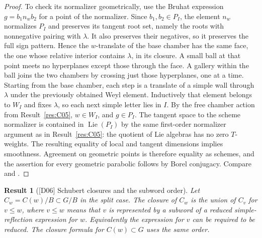 \documentclass[11pt,a4paper,openany,oneside]{book}
\theoremstyle{resultstyle}
\newtheorem{statement}{Result}[chapter]
\newenvironment{result}[2]{\clubpenalty=10000\begin{statement}[\textnormal{[#1]} #2]\leavevmode\label{res:#1}\ignorespaces}{\end{statement}}
\theoremstyle{definition}
\numberwithin{equation}{chapter}
\DeclareMathOperator{\Lie}{Lie}
\begin{document}
\begin{proof}
To check its normalizer geometrically, use the Bruhat expression
\(g=b_1n_wb_2\) for a point of the normalizer.
Since \(b_1,b_2\in P_I\), the element \(n_w\) normalizes
\(P_I\) and preserves its tangent root set, namely the
roots with nonnegative pairing with \(\lambda\).
It also preserves their negatives, so it preserves the
full sign pattern. Hence the \(w\)-translate of the base
chamber has the same face, the one whose relative interior
contains \(\lambda\), in its closure. A small ball at that
point meets no hyperplanes except those through the face.
A gallery within the ball joins the two chambers by
crossing just those hyperplanes, one at a time.
Starting from the base chamber, each step is a translate
of a simple wall through \(\lambda\) under the previously
obtained Weyl element. Inductively that element belongs to
\(W_I\) and fixes \(\lambda\), so each next simple letter
lies in \(I\). By the free chamber action from
Result~\ref{res:C05}, \(w\in W_I\), and \(g\in P_I\).
The tangent space to the scheme normalizer is contained
in \(\Lie(P_I)\) by the same first-order normalizer argument
as in Result~\ref{res:C05}: the quotient of Lie algebras has
no zero \(T\)-weights. The resulting equality of local
and tangent dimensions implies smoothness. Agreement on
geometric points is therefore equality as schemes, and
the assertion for every geometric parabolic follows by
Borel conjugacy. Compare \cite[Section 21.h]{milne}
and \cite[Corollary 5.2.8]{conrad}.
\end{proof}

\begin{result}{D06}{Schubert closures and the subword order}
Let \(C_w=C(w)/B\subset G/B\) in the split case. The closure of \(C_w\) is the union of \(C_v\) for \(v\le w\), where \(v\le w\) means that \(v\) is represented by a subword of a reduced simple-reflection expression for \(w\). Equivalently the expression for \(v\) can be required to be reduced. The closure formula for \(C(w)\subset G\) uses the same order.
\end{result}
\end{document}
